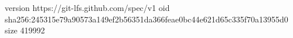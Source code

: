 version https://git-lfs.github.com/spec/v1
oid sha256:245315e79a90573a149ef2b56351da366feae0bc44e621d65c335f70a13955d0
size 419992
